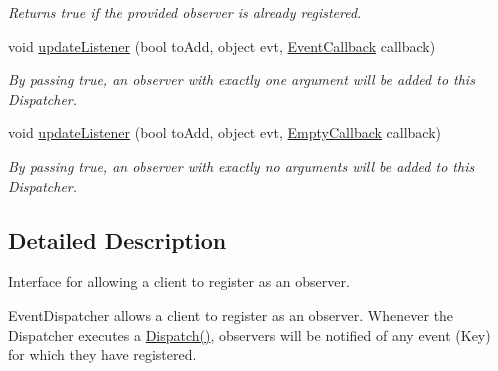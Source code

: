 \begin{DoxyCompactItemize}
\begin{DoxyCompactList}\small\item\em Returns true if the provided observer is already registered. \end{DoxyCompactList}\item 
\hypertarget{interfacestrange_1_1extensions_1_1dispatcher_1_1eventdispatcher_1_1api_1_1_i_event_dispatcher_aa6be925810292c7176d811fe699849e0}{void \hyperlink{interfacestrange_1_1extensions_1_1dispatcher_1_1eventdispatcher_1_1api_1_1_i_event_dispatcher_aa6be925810292c7176d811fe699849e0}{update\-Listener} (bool to\-Add, object evt, \hyperlink{namespacestrange_1_1extensions_1_1dispatcher_1_1eventdispatcher_1_1api_a5b2a372c9c074884178eb4a32992afd3}{Event\-Callback} callback)}\label{interfacestrange_1_1extensions_1_1dispatcher_1_1eventdispatcher_1_1api_1_1_i_event_dispatcher_aa6be925810292c7176d811fe699849e0}

\begin{DoxyCompactList}\small\item\em By passing true, an observer with exactly one argument will be added to this Dispatcher. \end{DoxyCompactList}\item 
\hypertarget{interfacestrange_1_1extensions_1_1dispatcher_1_1eventdispatcher_1_1api_1_1_i_event_dispatcher_a473a2c08f3eeb0e308f0210e76963f96}{void \hyperlink{interfacestrange_1_1extensions_1_1dispatcher_1_1eventdispatcher_1_1api_1_1_i_event_dispatcher_a473a2c08f3eeb0e308f0210e76963f96}{update\-Listener} (bool to\-Add, object evt, \hyperlink{namespacestrange_1_1extensions_1_1dispatcher_1_1eventdispatcher_1_1api_a4d68e68b31e6e0f733bd72ddcd6111fa}{Empty\-Callback} callback)}\label{interfacestrange_1_1extensions_1_1dispatcher_1_1eventdispatcher_1_1api_1_1_i_event_dispatcher_a473a2c08f3eeb0e308f0210e76963f96}

\begin{DoxyCompactList}\small\item\em By passing true, an observer with exactly no arguments will be added to this Dispatcher. \end{DoxyCompactList}\end{DoxyCompactItemize}


\subsection{Detailed Description}
Interface for allowing a client to register as an observer. 

Event\-Dispatcher allows a client to register as an observer. Whenever the Dispatcher executes a {\ttfamily \hyperlink{interfacestrange_1_1extensions_1_1dispatcher_1_1api_1_1_i_dispatcher_afec6755050bf9891321a7bfd4da1f06b}{Dispatch()}}, observers will be notified of any event (Key) for which they have registered.

